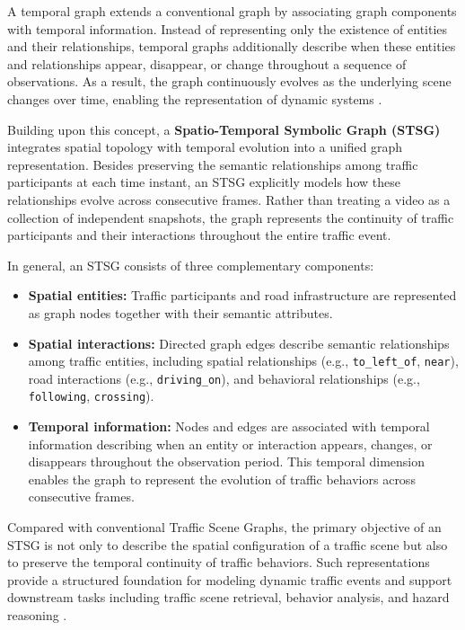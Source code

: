\documentclass[a4paper, 11pt]{article} %
\begin{document}
A temporal graph extends a conventional graph by associating graph components with temporal information. Instead of representing only the existence of entities and their relationships, temporal graphs additionally describe when these entities and relationships appear, disappear, or change throughout a sequence of observations. As a result, the graph continuously evolves as the underlying scene changes over time, enabling the representation of dynamic systems \cite{bao2020uncertainty}.

Building upon this concept, a \textbf{Spatio-Temporal Symbolic Graph (STSG)} integrates spatial topology with temporal evolution into a unified graph representation. Besides preserving the semantic relationships among traffic participants at each time instant, an STSG explicitly models how these relationships evolve across consecutive frames. Rather than treating a video as a collection of independent snapshots, the graph represents the continuity of traffic participants and their interactions throughout the entire traffic event.

In general, an STSG consists of three complementary components:

\begin{itemize}
    \item \textbf{Spatial entities:} Traffic participants and road infrastructure are represented as graph nodes together with their semantic attributes.

    \item \textbf{Spatial interactions:} Directed graph edges describe semantic relationships among traffic entities, including spatial relationships (e.g., \texttt{to\_left\_of}, \texttt{near}), road interactions (e.g., \texttt{driving\_on}), and behavioral relationships (e.g., \texttt{following}, \texttt{crossing}).

    \item \textbf{Temporal information:} Nodes and edges are associated with temporal information describing when an entity or interaction appears, changes, or disappears throughout the observation period. This temporal dimension enables the graph to represent the evolution of traffic behaviors across consecutive frames.
\end{itemize}

Compared with conventional Traffic Scene Graphs, the primary objective of an STSG is not only to describe the spatial configuration of a traffic scene but also to preserve the temporal continuity of traffic behaviors. Such representations provide a structured foundation for modeling dynamic traffic events and support downstream tasks including traffic scene retrieval, behavior analysis, and hazard reasoning \cite{song2024road,bao2020uncertainty}.
\end{document}
